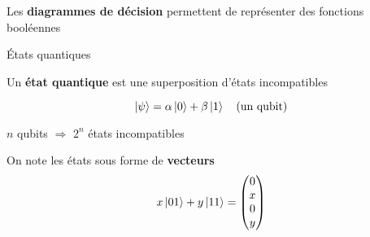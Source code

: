 \documentclass[french, 12pt]{beamer}
\begin{document}
\begin{frame}
    Les \textbf{diagrammes de décision} permettent de représenter des fonctions booléennes

    \vspace{1em}
    \begin{center}
    \end{center}
\end{frame}

\begin{frame}{États quantiques}

    Un \textbf{état quantique} est une superposition d'états incompatibles

    $$\ket{\psi} = \alpha \ket{0} + \beta \ket{1} \quad \text{(un qubit)}$$

    \pause
    \begin{center}
        $n$ qubits $\Rightarrow$ $2^n$ états incompatibles
    \end{center}
On note les états sous forme de \textbf{vecteurs}
$$x \ket {01} + y \ket {11} = \begin{pmatrix}
    0 \\ x \\ 0 \\ y
\end{pmatrix}$$
\end{frame}
\end{document}
